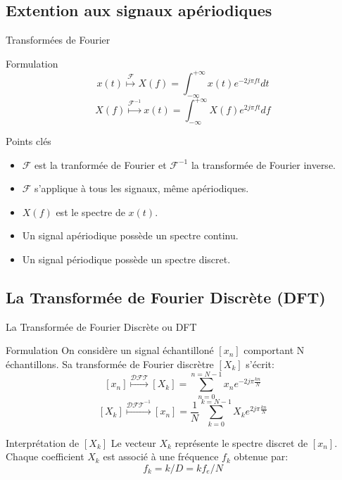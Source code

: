 \documentclass[8pt,a4paper]{beamer}
\begin{document}
\subsection{Extention aux signaux apériodiques}

\begin{frame}{Transformées de Fourier}



\begin{block}{Formulation}
$$
x(t) \overset{\mathcal{F}}{\longmapsto} X(f) = \int_{-\infty}^{+\infty}x(t)e^{-2j\pi ft}dt
$$
$$
X(f) \overset{\mathcal{F}^{-1}}{\longmapsto} x(t) = \int_{-\infty}^{+\infty}X(f)e^{2j\pi ft}df
$$
\end{block}

\begin{alertblock}{Points clés}
\begin{itemize}
\item $\mathcal F$ est la tranformée de Fourier et $\mathcal F^{-1}$ la transformée de Fourier inverse.
\item $\mathcal F$ s'applique à tous les signaux, même apériodiques.
\item $X(f)$ est le spectre de $x(t)$.
\item Un signal apériodique possède un spectre continu.
\item Un signal périodique possède un spectre discret. 
\end{itemize}
\end{alertblock}
\end{frame}


  \subsection{La Transformée de Fourier Discrète (DFT)}
  \begin{frame}{La Transformée de Fourier Discrète ou DFT}
  \begin{block}{Formulation}
  On considère un signal échantilloné $[x_n]$ comportant N échantillons. Sa transformée de Fourier discrètre $[X_k]$ s'écrit:
$$ 
  [x_n] \overset{\mathcal{DFT}}{\longmapsto} [X_k] = \sum\limits_{n=0}^{n=N-1}x_n e^{-2j\pi \frac{kn}{N}}
$$
$$
[X_k] \overset{\mathcal{DFT}^{-1}}{\longmapsto} [x_n] = \frac{1}{N}\sum\limits_{k=0}^{k=N-1}X_k e^{2j\pi \frac{kn}{N}}
$$
  
  \end{block}
  \begin{block}{Interprétation de $[X_k]$ }
  Le vecteur $X_k$ représente le spectre discret de $[x_n]$. Chaque coefficient $X_k$ est associé à une fréquence $f_k$ obtenue par:
  $$
  f_k = k/D = kf_e/{N}
  $$
  \end{block}
  \end{frame}
\end{document}
